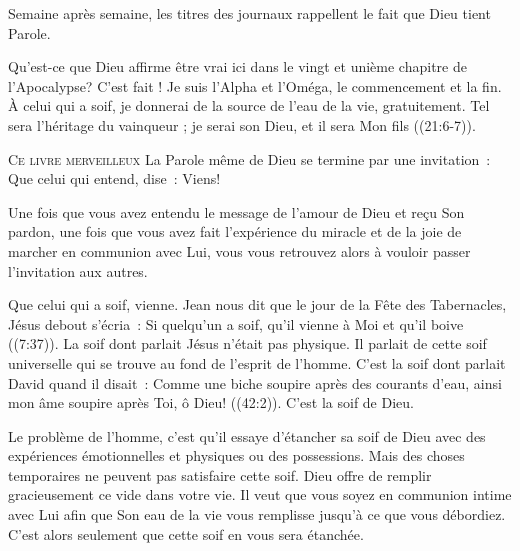 Semaine après semaine, les titres des journaux rappellent le fait
 que Dieu tient Parole. 

Qu'est-ce que Dieu affirme être vrai ici dans le vingt et unième chapitre
 de l'Apocalypse?
 \og C'est fait ! Je suis l'Alpha et l'Oméga, le commencement et la fin.
 À celui qui a soif, je donnerai de la source de l'eau de la vie,
 gratuitement. Tel sera l'héritage du vainqueur ;
 je serai son Dieu, et il sera Mon fils \fg{} ((21:6-7)).

\dvrule






\lettrine{C}{e livre merveilleux}
 \ocadr La Parole même de Dieu \fcadr{}
 se termine par une invitation~: 
 \og Que celui qui entend, dise~: 
 \og Viens! \fg{} 

Une fois que vous avez entendu le message de l'amour de Dieu
 et reçu Son pardon, une fois que vous avez fait l'expérience
 du miracle et de la joie de marcher en communion avec Lui,
 vous vous retrouvez alors à vouloir passer l'invitation aux autres. 

\og Que celui qui a soif, vienne. \fg{}
 Jean nous dit que le jour de la Fête des Tabernacles,
 Jésus debout s'écria~:
 \og Si quelqu'un a soif, qu'il vienne à Moi et qu'il boive \fg{}
 ((7:37)).
 La soif dont parlait Jésus n'était pas physique.
 Il parlait de cette soif universelle qui se trouve au fond
 de l'esprit de l'homme. C'est la soif dont parlait David
 quand il disait~: 
 \og Comme une biche soupire après des courants d'eau,
 ainsi mon âme soupire après Toi, ô Dieu! \fg{} ((42:2)).
 C'est la soif de Dieu. 

Le problème de l'homme, c'est qu'il essaye d'étancher sa soif de Dieu
 avec des expériences émotionnelles et physiques ou des possessions.
 Mais des choses temporaires ne peuvent pas satisfaire cette soif.
 Dieu offre de remplir gracieusement ce vide dans votre vie.
 Il veut que vous soyez en communion intime avec Lui
 afin que Son eau de la vie vous remplisse jusqu'à ce que vous débordiez.
 C'est alors seulement que cette soif en vous sera étanchée. 


\dvrule


